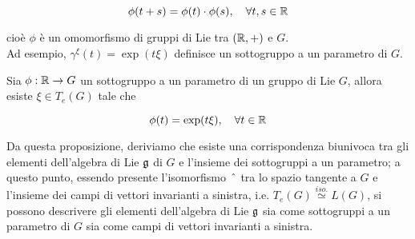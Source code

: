 \begin{equation}
	\phi(t+s) = \phi(t) \cdot \phi(s) \qcomma \forall t,s \in \R
\end{equation}

cioè $ \phi $ è un omomorfismo di gruppi di Lie tra $ (\mathbb{R},+) $ e $ G $.\\
Ad esempio, $ \gamma^{\xi}(t) = \exp(t \xi) $ definisce un sottogruppo a un parametro di $ G $.

\begin{definition}
	Sia $ \phi : \mathbb{R} \to G $ un sottogruppo a un parametro di un gruppo di Lie $ G $, allora esiste $ \xi \in T_{e}(G) $ tale che
	
	\begin{equation}
		\phi(t) = \exp (t \xi) \qcomma \forall t \in \R
	\end{equation}
\end{definition}

\begin{remark}
	Da questa proposizione, deriviamo che esiste una corrispondenza biunivoca tra gli elementi dell'algebra di Lie $ \mathfrak{g} $ di $ G $ e l'insieme dei sottogruppi a un parametro; a questo punto, essendo presente l'isomorfismo $ \; \hat{} \; $ tra lo spazio tangente a $ G $ e l'insieme dei campi di vettori invarianti a sinistra, i.e. $ T_{e}(G) \stackrel{iso.}{\simeq} L(G) $, si possono descrivere gli elementi dell'algebra di Lie $ \mathfrak{g} $ sia come sottogruppi a un parametro di $ G $ sia come campi di vettori invarianti a sinistra.
\end{remark}

